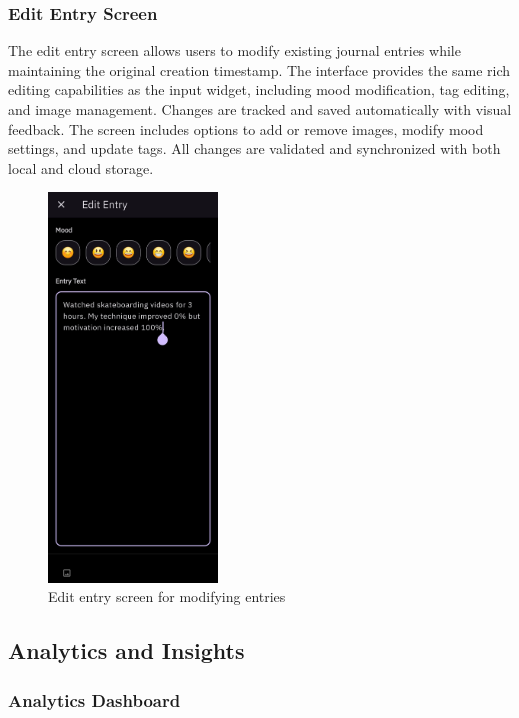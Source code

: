 \subsubsection{Edit Entry Screen}

The edit entry screen allows users to modify existing journal entries while maintaining the original creation timestamp. The interface provides the same rich editing capabilities as the input widget, including mood modification, tag editing, and image management. Changes are tracked and saved automatically with visual feedback. The screen includes options to add or remove images, modify mood settings, and update tags. All changes are validated and synchronized with both local and cloud storage.

\begin{samepage}
\begin{figure}[H]
\centering
\includegraphics[width=0.4\textwidth]{files/imgs/prototype/edit_entry_screen.jpeg}
\caption{Edit entry screen for modifying entries}
\label{fig:edit-entry-screen}
\end{figure}
\end{samepage}

\subsection{Analytics and Insights}

\subsubsection{Analytics Dashboard}

